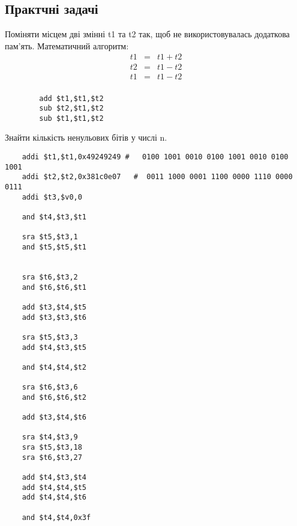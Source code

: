 \subsection{Практчні задачі}
\begin{tsk}
	Поміняти місцем дві змінні t1 та t2 так, щоб не використовувалась додаткова пам’ять.
	Математичний алгоритм:
	\begin{eqnarray}
		t1 &=& t1 + t2 \\
		t2 &=& t1 - t2\\
		t1 &=& t1 - t2\\
	\end{eqnarray}
	\begin{verbatim}
		add $t1,$t1,$t2
		sub $t2,$t1,$t2
		sub $t1,$t1,$t2
	\end{verbatim}
\end{tsk}
\begin{tsk}
	Знайти кількість ненульових бітів у числі n.\\
	\begin{verbatim}
	addi $t1,$t1,0x49249249 #   0100 1001 0010 0100 1001 0010 0100 1001
	addi $t2,$t2,0x381c0e07   #  0011 1000 0001 1100 0000 1110 0000 0111
	addi $t3,$v0,0 

	and $t4,$t3,$t1

	sra $t5,$t3,1
	and $t5,$t5,$t1


	sra $t6,$t3,2
	and $t6,$t6,$t1

	add $t3,$t4,$t5
	add $t3,$t3,$t6

	sra $t5,$t3,3
	add $t4,$t3,$t5

	and $t4,$t4,$t2

	sra $t6,$t3,6
	and $t6,$t6,$t2

	add $t3,$t4,$t6

	sra $t4,$t3,9
	sra $t5,$t3,18
	sra $t6,$t3,27

	add $t4,$t3,$t4
	add $t4,$t4,$t5
	add $t4,$t4,$t6

	and $t4,$t4,0x3f
	\end{verbatim}
\end{tsk}